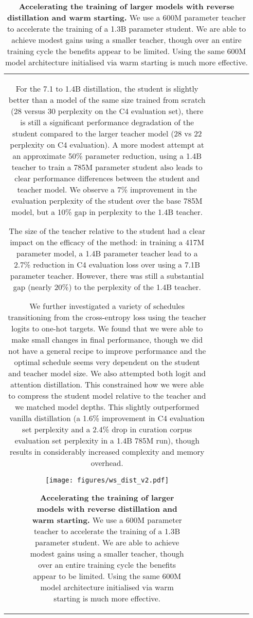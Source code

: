 \documentclass[11pt, a4paper, logo, internal, copyright, nonumbering]{deepmind}
\begin{document}
\begin{center}
\begin{longtable}{cclccc}
{For the 7.1 to 1.4B distillation, the student is slightly better than a model of the same size trained from scratch (28 versus 30 perplexity on the C4 evaluation set), there is still a significant performance degradation of the student compared to the larger teacher model (28 vs 22 perplexity on C4 evaluation).
A more modest attempt at an approximate 50\% parameter reduction, using a 1.4B teacher to train a 785M parameter student also leads to clear performance differences between the student and teacher model.
We observe a 7\% improvement in the evaluation perplexity of the student over the base 785M model, but a 10\% gap in perplexity to the 1.4B teacher.

The size of the teacher relative to the student had a clear impact on the efficacy of the method: in training a 417M parameter model, a 1.4B parameter teacher lead to a 2.7\% reduction in C4 evaluation loss over using a 7.1B parameter teacher. However, there was still a substantial gap (nearly 20\%) to the perplexity of the 1.4B teacher.

We further investigated a variety of schedules transitioning from the cross-entropy loss using the teacher logits to one-hot targets. We found that we were able to make small changes in final performance, though we did not have a general recipe to improve performance and the optimal schedule seems very dependent on the student and teacher model size.
We also attempted both logit and attention distillation. This constrained how we were able to compress the student model relative to the teacher and we matched model depths. This slightly outperformed vanilla distillation (a 1.6\% improvement in C4 evaluation set perplexity and a 2.4\% drop in curation corpus evaluation set perplexity in a 1.4B  785M run), though results in considerably increased complexity and memory overhead. 

\begin{figure}[t]
    \centering
    \texttt{[image: figures/ws\_dist\_v2.pdf]}
    \caption{
    \textbf{Accelerating the training of larger models with reverse distillation and warm starting.}
    We use a 600M parameter teacher to accelerate the training of a 1.3B parameter student. 
    We are able to achieve modest gains using a smaller teacher, though over an entire training cycle the benefits appear to be limited.
    Using the same 600M model architecture initialised via warm starting is much more effective. 
    }
    \label{fig:dyn_sparse}
\end{figure}

}
\end{longtable}
\end{center}
\end{document}
